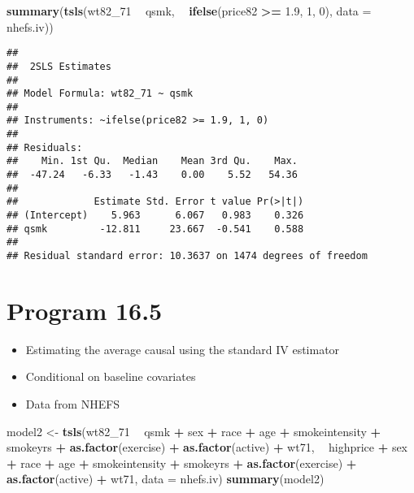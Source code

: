 \documentclass[10pt,]{book}
\newenvironment{Shaded}{\begin{snugshade}}{\end{snugshade}}
\newcommand{\DataTypeTok}[1]{\textcolor[rgb]{0.13,0.29,0.53}{#1}}
\newcommand{\DecValTok}[1]{\textcolor[rgb]{0.00,0.00,0.81}{#1}}
\newcommand{\FloatTok}[1]{\textcolor[rgb]{0.00,0.00,0.81}{#1}}
\newcommand{\KeywordTok}[1]{\textcolor[rgb]{0.13,0.29,0.53}{\textbf{#1}}}
\newcommand{\NormalTok}[1]{#1}
\newcommand{\OperatorTok}[1]{\textcolor[rgb]{0.81,0.36,0.00}{\textbf{#1}}}
\newcommand{\StringTok}[1]{\textcolor[rgb]{0.31,0.60,0.02}{#1}}
\providecommand{\tightlist}{%
  \setlength{\itemsep}{0pt}\setlength{\parskip}{0pt}}
\begin{document}
\begin{Shaded}
\begin{Highlighting}[]
\KeywordTok{summary}\NormalTok{(}\KeywordTok{tsls}\NormalTok{(wt82_}\DecValTok{71} \OperatorTok{~}\StringTok{ }\NormalTok{qsmk, }\OperatorTok{~}\StringTok{ }\KeywordTok{ifelse}\NormalTok{(price82 }\OperatorTok{>=}\StringTok{ }\FloatTok{1.9}\NormalTok{, }\DecValTok{1}\NormalTok{, }\DecValTok{0}\NormalTok{), }\DataTypeTok{data =}\NormalTok{ nhefs.iv))}
\end{Highlighting}
\end{Shaded}

\begin{verbatim}
## 
##  2SLS Estimates
## 
## Model Formula: wt82_71 ~ qsmk
## 
## Instruments: ~ifelse(price82 >= 1.9, 1, 0)
## 
## Residuals:
##    Min. 1st Qu.  Median    Mean 3rd Qu.    Max. 
##  -47.24   -6.33   -1.43    0.00    5.52   54.36 
## 
##             Estimate Std. Error t value Pr(>|t|)
## (Intercept)    5.963      6.067   0.983    0.326
## qsmk         -12.811     23.667  -0.541    0.588
## 
## Residual standard error: 10.3637 on 1474 degrees of freedom
\end{verbatim}

\hypertarget{program-16.5}{%
\section{Program 16.5}\label{program-16.5}}

\begin{itemize}
\tightlist
\item
  Estimating the average causal using the standard IV estimator
\item
  Conditional on baseline covariates
\item
  Data from NHEFS
\end{itemize}

\begin{Shaded}
\begin{Highlighting}[]
\NormalTok{model2 <-}\StringTok{ }\KeywordTok{tsls}\NormalTok{(wt82_}\DecValTok{71} \OperatorTok{~}\StringTok{ }\NormalTok{qsmk }\OperatorTok{+}\StringTok{ }\NormalTok{sex }\OperatorTok{+}\StringTok{ }\NormalTok{race }\OperatorTok{+}\StringTok{ }\NormalTok{age }\OperatorTok{+}\StringTok{ }\NormalTok{smokeintensity }\OperatorTok{+}\StringTok{ }\NormalTok{smokeyrs }\OperatorTok{+}\StringTok{ }
\StringTok{                      }\KeywordTok{as.factor}\NormalTok{(exercise) }\OperatorTok{+}\StringTok{ }\KeywordTok{as.factor}\NormalTok{(active) }\OperatorTok{+}\StringTok{ }\NormalTok{wt71,}
             \OperatorTok{~}\StringTok{ }\NormalTok{highprice }\OperatorTok{+}\StringTok{ }\NormalTok{sex }\OperatorTok{+}\StringTok{ }\NormalTok{race }\OperatorTok{+}\StringTok{ }\NormalTok{age }\OperatorTok{+}\StringTok{ }\NormalTok{smokeintensity }\OperatorTok{+}\StringTok{ }\NormalTok{smokeyrs }\OperatorTok{+}\StringTok{ }\KeywordTok{as.factor}\NormalTok{(exercise) }\OperatorTok{+}
\StringTok{               }\KeywordTok{as.factor}\NormalTok{(active) }\OperatorTok{+}\StringTok{ }\NormalTok{wt71, }\DataTypeTok{data =}\NormalTok{ nhefs.iv)}
\KeywordTok{summary}\NormalTok{(model2)}
\end{Highlighting}
\end{Shaded}
\end{document}
